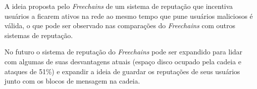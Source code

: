\documentclass[12pt]{article}
\newcommand{\FC} {\emph{Freechains}\xspace}
\begin{document}
A ideia proposta pelo \FC de um sistema de reputação que incentiva usuários a ficarem ativos na rede ao mesmo tempo que pune usuários maliciosos é válida, o que pode ser observado nas comparações do \FC com outros sistemas de reputação. 

No futuro o sistema de reputação do \FC pode ser expandido para lidar com algumas de suas desvantagens atuais (espaço disco ocupado pela cadeia e ataques de 51\%) e expandir a ideia de guardar os reputações de seus usuários junto com os blocos de mensagem na cadeia.



\end{document}
